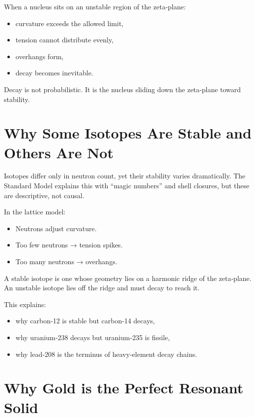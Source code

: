 \documentclass[11pt, letterpaper, openany]{book}
\begin{document}
When a nucleus sits on an unstable region of the zeta‑plane:

\begin{itemize}
    \item curvature exceeds the allowed limit,
    \item tension cannot distribute evenly,
    \item overhangs form,
    \item decay becomes inevitable.
\end{itemize}

Decay is not probabilistic.  
It is the nucleus sliding down the zeta‑plane toward stability.

\section{Why Some Isotopes Are Stable and Others Are Not}

Isotopes differ only in neutron count, yet their stability varies dramatically. The Standard
Model explains this with “magic numbers” and shell closures, but these are descriptive,
not causal.

In the lattice model:

\begin{itemize}
    \item Neutrons adjust curvature.
    \item Too few neutrons → tension spikes.
    \item Too many neutrons → overhangs.
\end{itemize}

A stable isotope is one whose geometry lies on a harmonic ridge of the zeta‑plane. An
unstable isotope lies off the ridge and must decay to reach it.

This explains:

\begin{itemize}
    \item why carbon‑12 is stable but carbon‑14 decays,
    \item why uranium‑238 decays but uranium‑235 is fissile,
    \item why lead‑208 is the terminus of heavy‑element decay chains.
\end{itemize}

\section{Why Gold is the Perfect Resonant Solid}
\end{document}
